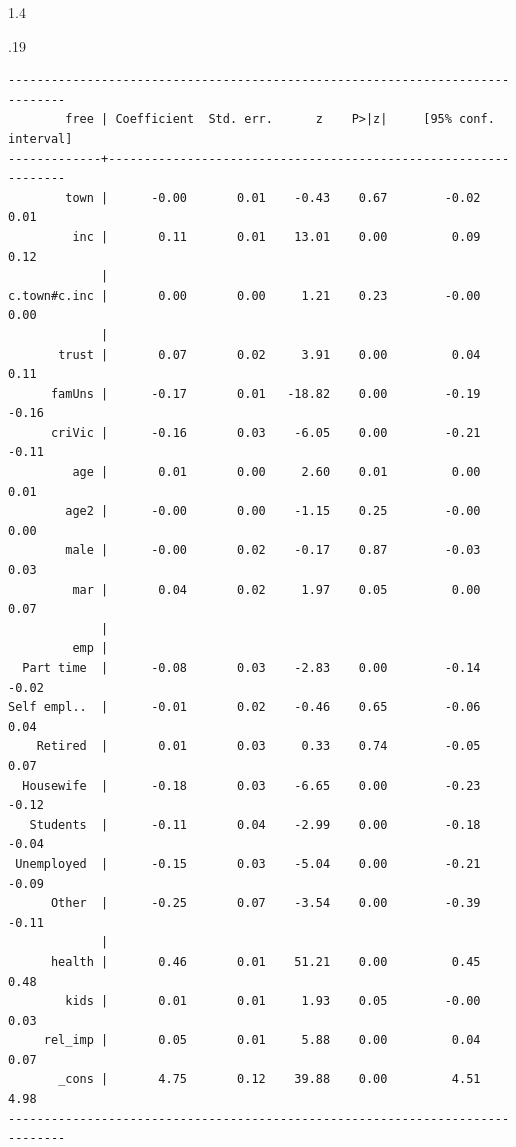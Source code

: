 \documentclass[10pt, letterpaper]{article}
\begin{document}
\begin{spacing}{1.4}
\begin{scriptsize}
\begin{spacing}{.19}
\begin{verbatim}
------------------------------------------------------------------------------
        free | Coefficient  Std. err.      z    P>|z|     [95% conf. interval]
-------------+----------------------------------------------------------------
        town |      -0.00       0.01    -0.43    0.67        -0.02        0.01
         inc |       0.11       0.01    13.01    0.00         0.09        0.12
             |
c.town#c.inc |       0.00       0.00     1.21    0.23        -0.00        0.00
             |
       trust |       0.07       0.02     3.91    0.00         0.04        0.11
      famUns |      -0.17       0.01   -18.82    0.00        -0.19       -0.16
      criVic |      -0.16       0.03    -6.05    0.00        -0.21       -0.11
         age |       0.01       0.00     2.60    0.01         0.00        0.01
        age2 |      -0.00       0.00    -1.15    0.25        -0.00        0.00
        male |      -0.00       0.02    -0.17    0.87        -0.03        0.03
         mar |       0.04       0.02     1.97    0.05         0.00        0.07
             |
         emp |
  Part time  |      -0.08       0.03    -2.83    0.00        -0.14       -0.02
Self empl..  |      -0.01       0.02    -0.46    0.65        -0.06        0.04
    Retired  |       0.01       0.03     0.33    0.74        -0.05        0.07
  Housewife  |      -0.18       0.03    -6.65    0.00        -0.23       -0.12
   Students  |      -0.11       0.04    -2.99    0.00        -0.18       -0.04
 Unemployed  |      -0.15       0.03    -5.04    0.00        -0.21       -0.09
      Other  |      -0.25       0.07    -3.54    0.00        -0.39       -0.11
             |
      health |       0.46       0.01    51.21    0.00         0.45        0.48
        kids |       0.01       0.01     1.93    0.05        -0.00        0.03
     rel_imp |       0.05       0.01     5.88    0.00         0.04        0.07
       _cons |       4.75       0.12    39.88    0.00         4.51        4.98
------------------------------------------------------------------------------


\end{verbatim}
\end{spacing}
\end{scriptsize}
\end{spacing}
\end{document}
